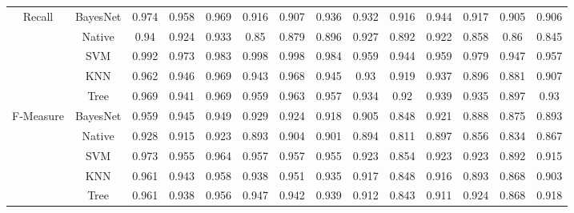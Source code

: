 \begin{table*}[ht]
\begin{tabular}{|c|c|c|c|c|c|c|c|c|c|c|c|c|c|}
\hline
\multirow{5}{*}{Recall}
&BayesNet&0.974	&0.958	&0.969	&	0.916	&0.907&	0.936		&0.932	&0.916	&0.944	&	0.917	&0.905	&0.906\\
&Native&0.94	&0.924	&0.933&		0.85	&0.879&	0.896		&0.927&	0.892	&0.922	&	0.858	&0.86&	0.845\\
&SVM&0.992	&0.973&	0.983		&0.998	&0.998&	0.984		&0.959	&0.944	&0.959		&0.979	&0.947	&0.957\\
&KNN&0.962&	0.946&	0.969	&	0.943	&0.968&	0.945		&0.93&	0.919&	0.937	&	0.896	&0.881&	0.907\\
&Tree&0.969&	0.941	&0.969	&	0.959&	0.963	&0.957	&	0.934	&0.92&	0.939	&	0.935	&0.897	&0.93\\
\hline
\multirow{5}{*}{F-Measure}
&BayesNet&0.959&	0.945&	0.949	&	0.929	&0.924&	0.918	&	0.905&	0.848	&0.921	&	0.888&	0.875&	0.893\\
&Native&0.928&	0.915	&0.923	&0.893	&0.904	&0.901		&0.894&	0.811&	0.897	&	0.856	&0.834	&0.867\\
&SVM&0.973&	0.955&	0.964	&	0.957&	0.957&	0.955	&	0.923&	0.854	&0.923&		0.923&	0.892&	0.915\\
&KNN&0.961&	0.943&	0.958	&	0.938	&0.951&	0.935		&0.917	&0.848	&0.916&		0.893&	0.868	&0.903\\
&Tree&0.961&	0.938&	0.956	&	0.947	&0.942&	0.939	&	0.912&	0.843	&0.911&		0.924	&0.868&	0.918\\
\hline
\end{tabular}
\end{table*}


